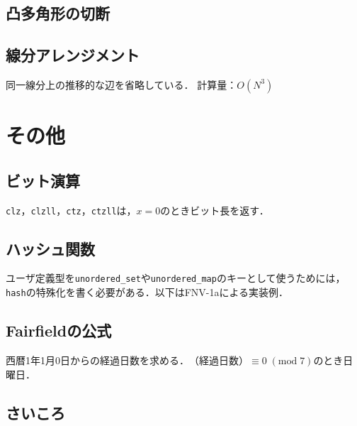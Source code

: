 \documentclass[landscape,twocolumn,9pt]{jsarticle}
\begin{document}
\subsection{凸多角形の切断}


\subsection{線分アレンジメント}
同一線分上の推移的な辺を省略している．
計算量：$O(N^3)$


\section{その他}%
\subsection{ビット演算}
\texttt{clz}，\texttt{clzll}，\texttt{ctz}，\texttt{ctzll}は，$x=0$のときビット長を返す．


\subsection{ハッシュ関数}
ユーザ定義型を\texttt{unordered\_set}や\texttt{unordered\_map}のキーとして使うためには，
\texttt{hash}の特殊化を書く必要がある．以下はFNV-1aによる実装例．


\subsection{Fairfieldの公式}
西暦1年1月0日からの経過日数を求める．$\text{（経過日数）}\equiv 0\; (\mathrm{mod}\; 7)$のとき日曜日．


\subsection{さいころ}

\end{document}
